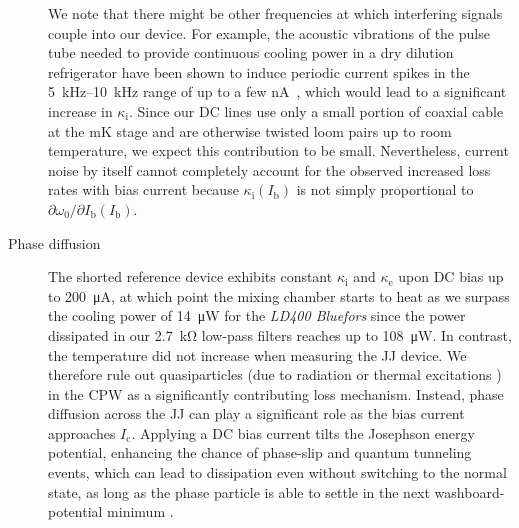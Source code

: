 \begin{description}
	We note that there might be other frequencies at which interfering signals couple into our device.
	For example, the acoustic vibrations of the pulse tube needed to provide continuous cooling power in a dry dilution refrigerator have been shown to induce periodic current spikes in the \SIrange{5}{10}{\kilo\hertz} range of up to a few \si{\nano\ampere}~\cite{kalraVibrationinducedElectricalNoise2016b}, which would lead to a significant increase in $\kappa_\text{i}$.
	Since our DC lines use only a small portion of coaxial cable at the mK stage and are otherwise twisted loom pairs up to room temperature, we expect this contribution to be small.
	Nevertheless, current noise by itself cannot completely account for the observed increased loss rates with bias current because $\kappa_\text{i}(I_\text{b})$ is not simply proportional to $\partial\omega_0/\partial I_\text{b}(I_\text{b})$.
	\item[Phase diffusion] The shorted reference device exhibits constant $\kappa_\text{i}$ and $\kappa_\text{e}$ upon DC bias up to \SI{200}{\micro\ampere}, at which point the mixing chamber starts to heat as we surpass the cooling power  of \SI{14}{\micro\watt} for the \textit{LD400 Bluefors} since the power dissipated in our \SI{2.7}{\kilo\ohm} low-pass filters reaches up to \SI{108}{\micro\watt}.
	In contrast, the temperature did not increase when measuring the JJ device.
	We therefore rule out quasiparticles (due to radiation or thermal excitations \cite{tinkhamIntroductionSuperconductivity1996}) in the CPW as a significantly contributing loss mechanism.
	Instead, phase diffusion across the JJ can play a significant role as the bias current approaches $I_\text{c}$.
	Applying a DC bias current tilts the Josephson energy potential, enhancing the chance of phase-slip and quantum tunneling events, which can lead to dissipation even without switching to the normal state, as long as the phase particle is able to settle in the next washboard-potential minimum \cite{kiviojaWeakCouplingJosephson2005}.
\end{description}

